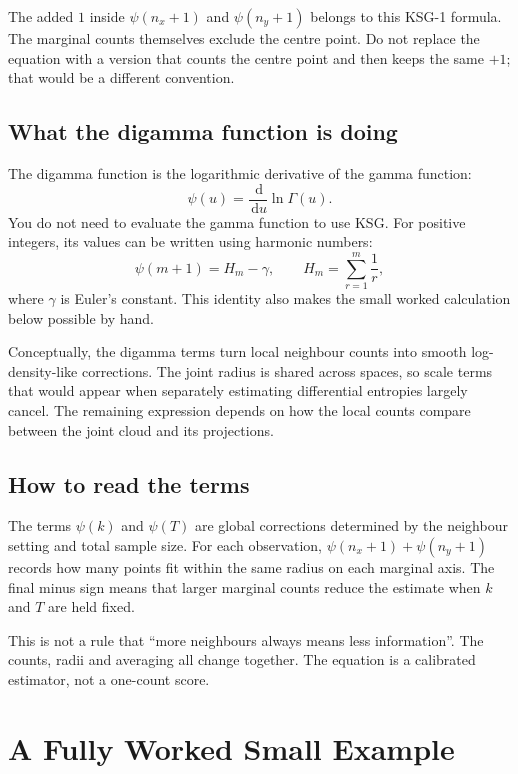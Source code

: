 \documentclass[11pt,letterpaper,oneside]{report}
\newcommand{\KSG}{\textsc{KSG}}
\newcommand{\dd}{\,\mathrm{d}}
\begin{document}
The added $1$ inside $\psi(n_x+1)$ and $\psi(n_y+1)$ belongs to this KSG-1 formula. The marginal counts themselves exclude the centre point. Do not replace the equation with a version that counts the centre point and then keeps the same $+1$; that would be a different convention.

\subsection{What the digamma function is doing}

The digamma function is the logarithmic derivative of the gamma function:
\begin{equation}
  \psi(u)=\frac{\dd}{\dd u}\ln\Gamma(u).
\end{equation}
You do not need to evaluate the gamma function to use \KSG. For positive integers, its values can be written using harmonic numbers:
\begin{equation}
  \psi(m+1)=H_m-\gamma,
  \qquad H_m=\sum_{r=1}^{m}\frac{1}{r},
\end{equation}
where $\gamma$ is Euler's constant. This identity also makes the small worked calculation below possible by hand.

Conceptually, the digamma terms turn local neighbour counts into smooth log-density-like corrections. The joint radius is shared across spaces, so scale terms that would appear when separately estimating differential entropies largely cancel. The remaining expression depends on how the local counts compare between the joint cloud and its projections.

\subsection{How to read the terms}

The terms $\psi(k)$ and $\psi(T)$ are global corrections determined by the neighbour setting and total sample size. For each observation, $\psi(n_x+1)+\psi(n_y+1)$ records how many points fit within the same radius on each marginal axis. The final minus sign means that larger marginal counts reduce the estimate when $k$ and $T$ are held fixed.

This is not a rule that “more neighbours always means less information”. The counts, radii and averaging all change together. The equation is a calibrated estimator, not a one-count score.

\section{A Fully Worked Small Example}
\end{document}
